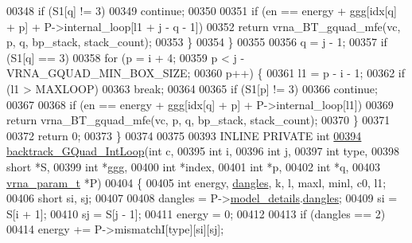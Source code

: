 \begin{DoxyCode}
00348       \textcolor{keywordflow}{if} (S1[q] != 3)
00349         \textcolor{keywordflow}{continue};
00350 
00351       \textcolor{keywordflow}{if} (en == energy + ggg[idx[q] + p] + P->internal\_loop[l1 + j - q - 1])
00352         \textcolor{keywordflow}{return} vrna\_BT\_gquad\_mfe(vc, p, q, bp\_stack, stack\_count);
00353     \}
00354   \}
00355 
00356   q = j - 1;
00357   \textcolor{keywordflow}{if} (S1[q] == 3)
00358     \textcolor{keywordflow}{for} (p = i + 4;
00359          p < j - VRNA\_GQUAD\_MIN\_BOX\_SIZE;
00360          p++) \{
00361       l1 = p - i - 1;
00362       \textcolor{keywordflow}{if} (l1 > MAXLOOP)
00363         \textcolor{keywordflow}{break};
00364 
00365       \textcolor{keywordflow}{if} (S1[p] != 3)
00366         \textcolor{keywordflow}{continue};
00367 
00368       \textcolor{keywordflow}{if} (en == energy + ggg[idx[q] + p] + P->internal\_loop[l1])
00369         \textcolor{keywordflow}{return} vrna\_BT\_gquad\_mfe(vc, p, q, bp\_stack, stack\_count);
00370     \}
00371 
00372   \textcolor{keywordflow}{return} 0;
00373 \}
00374 
00375 
00393 INLINE PRIVATE \textcolor{keywordtype}{int}
\hyperlink{group__gquads_ga220c41e8dbcee940ac975b8ce88e55c5}{00394} \hyperlink{group__gquads_ga220c41e8dbcee940ac975b8ce88e55c5}{backtrack\_GQuad\_IntLoop}(\textcolor{keywordtype}{int}           c,
00395                         \textcolor{keywordtype}{int}           i,
00396                         \textcolor{keywordtype}{int}           j,
00397                         \textcolor{keywordtype}{int}           type,
00398                         \textcolor{keywordtype}{short}         *S,
00399                         \textcolor{keywordtype}{int}           *ggg,
00400                         \textcolor{keywordtype}{int}           *index,
00401                         \textcolor{keywordtype}{int}           *p,
00402                         \textcolor{keywordtype}{int}           *q,
00403                         \hyperlink{group__energy__parameters_structvrna__param__s}{vrna\_param\_t}  *P)
00404 \{
00405   \textcolor{keywordtype}{int}   energy, \hyperlink{group__model__details_ga72b511ed1201f7e23ec437e468790d74}{dangles}, k, l, maxl, minl, c0, l1;
00406   \textcolor{keywordtype}{short} si, sj;
00407 
00408   dangles = P->\hyperlink{group__energy__parameters_a7b84353eb9075c595bad4ceb871bcae7}{model\_details}.\hyperlink{group__model__details_adcda4ff2ea77748ae0e8700288282efc}{dangles};
00409   si      = S[i + 1];
00410   sj      = S[j - 1];
00411   energy  = 0;
00412 
00413   \textcolor{keywordflow}{if} (dangles == 2)
00414     energy += P->mismatchI[type][si][sj];

\end{DoxyCode}
